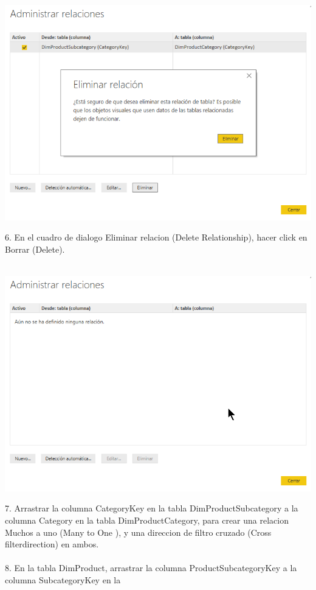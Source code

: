 \documentclass[12pt,letterpaper]{article}
\begin{document}
\begin{center}
\includegraphics[width=15cm]{IMG/7.png} 
\end{center}
6. En el cuadro de dialogo Eliminar relacion (Delete Relationship), hacer click en Borrar (Delete).\\\\
\begin{center}
\includegraphics[width=15cm]{IMG/8.png} 
\end{center}
7. Arrastrar la columna CategoryKey en la tabla DimProductSubcategory a la columna Category en la tabla
DimProductCategory, para crear una relacion Muchos a uno (Many to One ), y una direccion de filtro
cruzado (Cross filterdirection) en ambos.\\\\
8. En la tabla DimProduct, arrastrar la columna ProductSubcategoryKey a la columna SubcategoryKey en la
\end{document}
